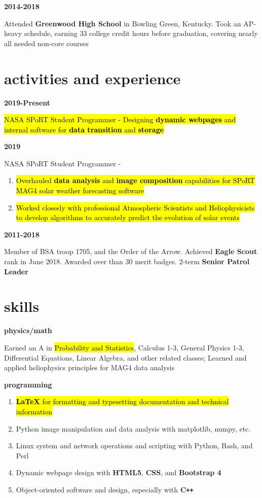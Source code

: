 \documentclass[9pt]{article}
\newcommand{\entry}[2]{
	\begin{minipage}[c]{.14\textwidth}
		{\small\textbf{#1}}\hfill
	\end{minipage}
	{\color{OliveGreen}\hfill \vline \hfill}
	\begin{minipage}[c]{.8\textwidth}
		#2
	\end{minipage}\vspace{.12in}
	}
\begin{document}
	\entry{2014-2018}{Attended \textbf{Greenwood High School} in Bowling Green, Kentucky. Took an AP-heavy schedule, earning 33 college credit hours before graduation, covering nearly all needed non-core courses}

\section{activities and experience}
\textit{}

\entry{2019-Present}{\hl{NASA SPoRT Student Programmer - Designing \textbf{dynamic webpages} and internal software for \textbf{data transition} and \textbf{storage}}}

	\entry{2019}{NASA SPoRT Student Programmer -
		\begin{enumerate}

			\item{\hl{Overhauled \textbf{data analysis} and \textbf{image composition} capabilities for SPoRT MAG4 solar weather forecasting software}}

			\item{\hl{Worked closesly with professional Atmospheric Scientists and Heliophysicists to develop algorithms to accurately predict the evolution of solar events}}

		\end{enumerate}
		}

	\entry{2011-2018}{Member of BSA troop 1705, and the Order of the Arrow. Achieved \textbf{Eagle Scout} rank in June 2018. Awarded over than 30 merit badges. 2-term \textbf{Senior Patrol Leader}}

\section{skills}
\textit{}

	\entry{physics/math}{Earned an A in \hl{Probability and Statistics}, Calculus 1-3, General Physics 1-3, Differential Equations, Linear Algebra, and other related classes; Learned and applied heliophysics principles for MAG4 data analysis}

	\entry{programming}{
		\begin{enumerate}
			\item{\hl{\textbf{LaTeX} for formatting and typesetting documentation and technical information}}
			\item{Python image manipulation and data analysis with matplotlib, numpy, etc.}
			\item{Linux system and network operations and scripting with Python, Bash, and Perl}
			\item{Dynamic webpage design with \textbf{HTML5}, \textbf{CSS}, and \textbf{Bootstrap 4}}
			\item{Object-oriented software and design, especially with \textbf{C\texttt{++}}}
		\end{enumerate}
	}
\end{document}
